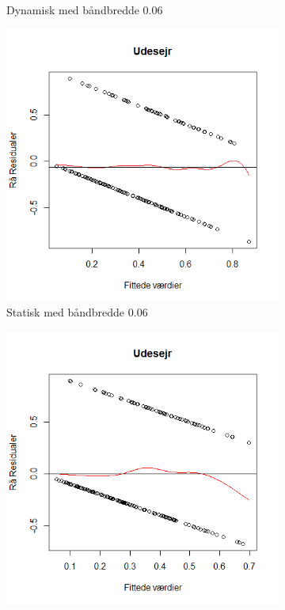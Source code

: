 \documentclass[11pt,a4paper]{article}
\begin{document}
\begin{figure}[h!]
\begin{subfigure}[b]{0.425\linewidth}
    \caption{Dynamisk med båndbredde 0.06}
    \label{fig:ResDHS}
  \end{subfigure}
  \begin{subfigure}[b]{0.425\linewidth}
    \includegraphics[width=\linewidth]{ResSUS.png}
    \caption{Statisk med båndbredde 0.06}
    \label{fig:ResSUS}
  \end{subfigure}
  \begin{subfigure}[b]{0.425\linewidth}
    \includegraphics[width=\linewidth]{ResDUS.png}

\end{subfigure}
\end{figure}
\end{document}
